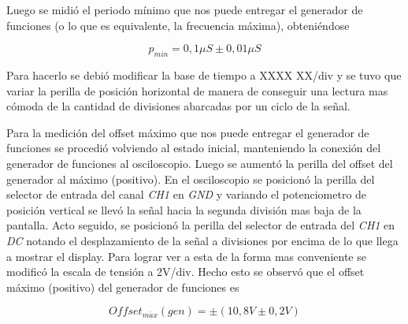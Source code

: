 \documentclass{article}
\begin{document}
	Luego se midió el periodo mínimo que nos puede entregar el generador de funciones (o lo que es equivalente, la frecuencia máxima), obteniéndose

\begin{equation*}
	p_{min} = 0,1\mu S \pm 0,01\mu S
\end{equation*}
\medskip

\noindent Para hacerlo se debió modificar la base de tiempo a XXXX XX/div y se tuvo que variar la perilla de posición horizontal de manera de conseguir una lectura mas cómoda de la cantidad de divisiones abarcadas por un ciclo de la señal.
	\par
	Para la medición del offset máximo que nos puede entregar el generador de funciones se procedió volviendo al estado inicial, manteniendo la conexión del generador de funciones al osciloscopio. Luego se aumentó la perilla del offset del generador al máximo (positivo). En el osciloscopio se posicionó la perilla del selector de entrada del canal \textit{CH1} en \textit{GND} y variando el potenciometro de posición vertical se llevó la señal hacia la segunda división mas baja de la pantalla. Acto seguido, se posicionó la perilla del selector de entrada del \textit{CH1} en \textit{DC} notando el desplazamiento de la señal a divisiones por encima de lo que llega a mostrar el display. Para lograr ver a esta de la forma mas conveniente se modificó la escala de tensión a 2V/div. Hecho esto se observó que el offset máximo (positivo) del generador de funciones es

\begin{equation*}
	Offset_{m\acute{a}x}(gen) = \pm (10,8V \pm 0,2V)
\end{equation*}
\medskip
\end{document}
